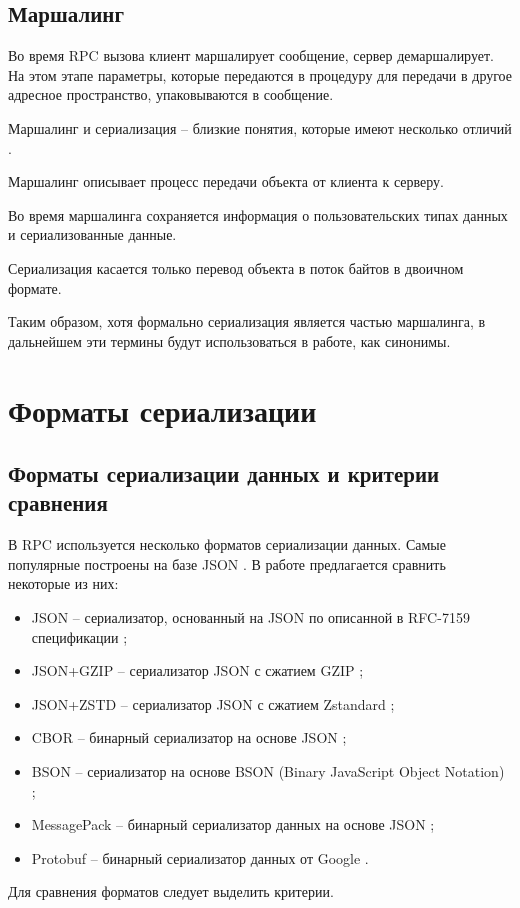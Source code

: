 \clearpage
\section{Маршалинг}

Во время RPC вызова клиент маршалирует сообщение, сервер демаршалирует.
На этом этапе параметры, которые передаются в процедуру для передачи в другое адресное пространство, упаковываются в сообщение.

Маршалинг и сериализация -- близкие понятия, которые имеют несколько отличий \cite{marshal-vs-serialize}.

Маршалинг описывает процесс передачи объекта от клиента к серверу. 

Во время маршалинга сохраняется информация о пользовательских типах данных и сериализованные данные.

Сериализация касается только перевод объекта в поток байтов в двоичном формате.

Таким образом, хотя формально сериализация является частью маршалинга, в дальнейшем эти термины будут использоваться в работе, как синонимы.

\chapter{Форматы сериализации}

\section{Форматы сериализации данных и критерии сравнения}

В RPC используется несколько форматов сериализации данных.  
Самые популярные построены на базе JSON \cite{json-info}.
В работе предлагается сравнить некоторые из них:
\begin{itemize}
\item JSON -- сериализатор, основанный на JSON по описанной в RFC-7159 спецификации \cite{json-serialize};
\item JSON+GZIP -- сериализатор JSON с сжатием GZIP \cite{gzip};
\item JSON+ZSTD -- сериализатор JSON с сжатием Zstandard \cite{zstd};
\item CBOR -- бинарный сериализатор на основе JSON  \cite{cbor};
\item BSON -- сериализатор на основе BSON (Binary JavaScript Object Notation) \cite{bson};
\item MessagePack -- бинарный сериализатор данных на основе JSON \cite{messagepack};
\item Protobuf -- бинарный сериализатор данных от Google \cite{protobuf}.
\end{itemize}
\newpage
Для сравнения форматов следует выделить критерии.


